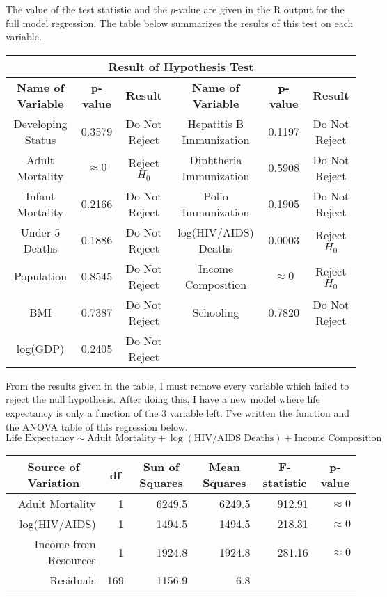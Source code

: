 \documentclass{article}
\renewcommand{\l}{\left}
\renewcommand{\r}{\right}
\begin{document}
	The value of the test statistic and the $p$-value are given in the R output for the full model regression. The table below summarizes the results of this test on each variable.
\begin{table}[ht]
\centering
\footnotesize
\begin{tabular}{|c|c|c|c|c|c|}
\hline
\multicolumn{6}{|c|}{\textbf{Result of Hypothesis Test}} \\ \hline
\textbf{Name of Variable} & \textbf{p-value} & \textbf{Result} & \textbf{Name of Variable} & \textbf{p-value} & \textbf{Result} \\ \hline
Developing Status & 0.3579 & Do Not Reject  & Hepatitis B Immunization & 0.1197 & Do Not Reject \\ \hline
Adult Mortality & $\approx 0$ & Reject $H_0$ & Diphtheria Immunization & 0.5908 & Do Not Reject \\ \hline
Infant Mortality & 0.2166 & Do Not Reject & Polio Immunization & 0.1905 & Do Not Reject \\ \hline
Under-5 Deaths & 0.1886 & Do Not Reject & log(HIV/AIDS) Deaths & 0.0003 & Reject $H_0$ \\ \hline
Population & 0.8545 &Do Not Reject  & Income Composition & $\approx 0$ & Reject $H_0$  \\ \hline
BMI & 0.7387 &Do Not Reject  & Schooling & 0.7820 & Do Not Reject \\ \hline
log(GDP) & 0.2405 & Do Not Reject &  &  &  \\ \hline
\end{tabular}
\end{table}

From the results given in the table, I must remove every variable which failed to reject the null hypothesis. After doing this, I have a new model where life expectancy is only a function of the 3 variable left. I've written the function and the ANOVA table of this regression below.
$$\text{Life Expectancy} \sim \text{Adult Mortality} + \log \l(\text{HIV/AIDS Deaths}\r) + \text{Income Composition}$$
\vspace{-7mm}
\begin{table}[ht]
\centering
\footnotesize
\begin{tabular}{|r|r|r|r|r|r|}
\hline
\multicolumn{1}{|c|}{\textbf{Source of Variation}} & \multicolumn{1}{c|}{\textbf{df}} & \multicolumn{1}{c|}{\textbf{Sun of Squares}} & \multicolumn{1}{c|}{\textbf{Mean Squares}} & \multicolumn{1}{c|}{\textbf{F-statistic}} & \multicolumn{1}{c|}{\textbf{p-value}} \\ \hline
Adult Mortality & 1 & 6249.5 & 6249.5 & 912.91 & $\approx 0$  \\ \hline
log(HIV/AIDS) & 1 & 1494.5 & 1494.5 & 218.31 & $\approx 0$ \\ \hline
Income from Resources & 1 & 1924.8 & 1924.8 & 281.16 & $\approx 0$ \\ \hline
Residuals & 169 & 1156.9 & 6.8 &  &  \\ \hline
\end{tabular}
\end{table}
\end{document}
